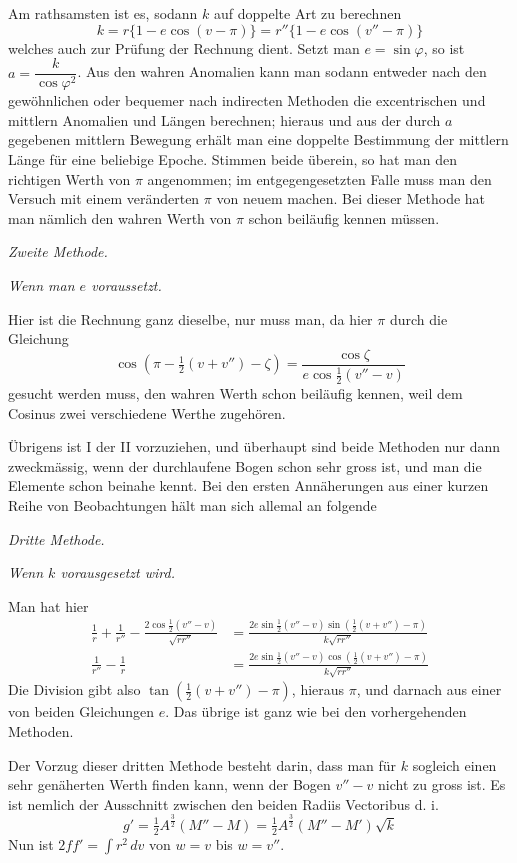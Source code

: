 \documentclass[10pt,a4paper]{article}
\begin{document}
Am rathsamsten ist es, sodann $k$ auf doppelte Art zu berechnen
\[
k = r\{1 - e\cos(v - \pi)\} = r''\{1 - e\cos(v'' - \pi)\}
\]
welches auch zur Prüfung der Rechnung dient. Setzt man $e = \sin\varphi$, so ist $a = \dfrac{k}{\cos\varphi^2}$. Aus den wahren Anomalien kann man sodann entweder nach den gewöhnlichen oder bequemer nach indirecten Methoden die excentrischen und mittlern Anomalien und Längen berechnen; hieraus und aus der durch $a$ gegebenen mittlern Bewegung erhält man eine doppelte Bestimmung der mittlern Länge für eine beliebige Epoche. Stimmen beide überein, so hat man den richtigen Werth von $\pi$ angenommen; im entgegengesetzten Falle muss man den Versuch mit einem veränderten $\pi$ von neuem machen. Bei dieser Methode hat man nämlich den wahren Werth von $\pi$ schon beiläufig kennen müssen.

\medskip
\noindent
\textit{Zweite Methode.}

\medskip
\noindent
\textit{Wenn man $e$ voraussetzt.}

Hier ist die Rechnung ganz dieselbe, nur muss man, da hier $\pi$ durch die Gleichung
\[
\cos(\pi - \tfrac{1}{2}(v + v'') - \zeta) = \frac{\cos\zeta}{e\cos\tfrac{1}{2}(v'' - v)}
\]
gesucht werden muss, den wahren Werth schon beiläufig kennen, weil dem Cosinus zwei verschiedene Werthe zugehören.

Übrigens ist I der II vorzuziehen, und überhaupt sind beide Methoden nur dann zweckmässig, wenn der durchlaufene Bogen schon sehr gross ist, und man die Elemente schon beinahe kennt. Bei den ersten Annäherungen aus einer kurzen Reihe von Beobachtungen hält man sich allemal an folgende

\medskip
\noindent
\textit{Dritte Methode.}

\medskip
\noindent
\textit{Wenn $k$ vorausgesetzt wird.}

Man hat hier
\begin{align*}
\frac{1}{r} + \frac{1}{r''} - \frac{2\cos\tfrac{1}{2}(v'' - v)}{\sqrt{rr''}} &= \frac{2e\sin\tfrac{1}{2}(v'' - v)\sin(\tfrac{1}{2}(v + v'') - \pi)}{k\sqrt{rr''}} \\
\frac{1}{r''} - \frac{1}{r} &= \frac{2e\sin\tfrac{1}{2}(v'' - v)\cos(\tfrac{1}{2}(v + v'') - \pi)}{k\sqrt{rr''}}
\end{align*}
Die Division gibt also $\tan(\tfrac{1}{2}(v + v'') - \pi)$, hieraus $\pi$, und darnach aus einer von beiden Gleichungen $e$. Das übrige ist ganz wie bei den vorhergehenden Methoden.

Der Vorzug dieser dritten Methode besteht darin, dass man für $k$ sogleich einen sehr genäherten Werth finden kann, wenn der Bogen $v'' - v$ nicht zu gross ist. Es ist nemlich der Ausschnitt zwischen den beiden Radiis Vectoribus d. i.
\[
g' = \tfrac{1}{2}A^{\frac{3}{2}}(M'' - M) = \tfrac{1}{2}A^{\frac{3}{2}}(M'' - M')\sqrt{k}
\]
Nun ist $2ff' = \int r^2\,dv$ von $w = v$ bis $w = v''$.
\end{document}
